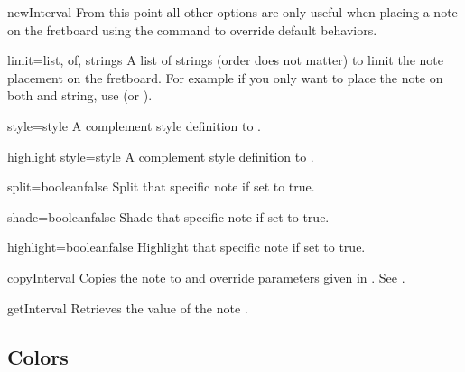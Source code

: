 \documentclass[a4paper]{article}
\begin{document}
\begin{docCommand}{newInterval}{}
  From this point all other options are only useful when placing a note on
  the fretboard using the  command to override default
  behaviors.

  \begin{docKey}{limit}{={list, of, strings}}{}
    A list of strings (order does not matter) to limit the note placement on
    the fretboard. For example if you only want to place the note on both
     and  string, use  (or ).
  \end{docKey}

  \begin{docKey}{style}{={style}}{}
    A complement style definition to .
  \end{docKey}

  \begin{docKey}{highlight style}{={style}}{}
    A complement style definition to .
  \end{docKey}

  \begin{docKey}{split}{={boolean}}{false}
    Split that specific note if set to true.
  \end{docKey}

  \begin{docKey}{shade}{={boolean}}{false}
    Shade that specific note if set to true.
  \end{docKey}

  \begin{docKey}{highlight}{={boolean}}{false}
    Highlight that specific note if set to true.
  \end{docKey}

\end{docCommand}

\begin{docCommand}{copyInterval}{}
  Copies the note  to  and override parameters given in
  . See .
\end{docCommand}

\begin{docCommand}{getInterval}{}
  Retrieves the  value of the note .
\end{docCommand}


\subsection{Colors}
\end{document}
